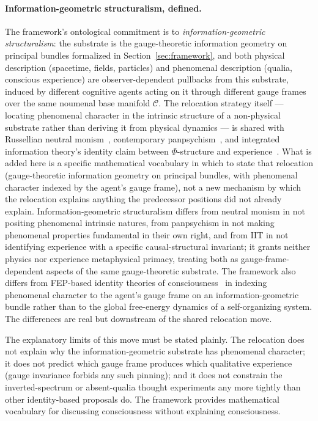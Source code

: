 \documentclass[11pt]{article}
\begin{document}
\paragraph{Information-geometric structuralism, defined.}
The framework's ontological commitment is to \emph{information-geometric structuralism}: the substrate is the gauge-theoretic information geometry on principal bundles formalized in Section~\ref{sec:framework}, and both physical description (spacetime, fields, particles) and phenomenal description (qualia, conscious experience) are observer-dependent pullbacks from this substrate, induced by different cognitive agents acting on it through different gauge frames over the same noumenal base manifold $\mathcal{C}$. The relocation strategy itself — locating phenomenal character in the intrinsic structure of a non-physical substrate rather than deriving it from physical dynamics — is shared with Russellian neutral monism~\cite{Russell1927, Strawson2006}, contemporary panpsychism~\cite{Goff2017, Chalmers2013consciousness}, and integrated information theory's identity claim between $\Phi$-structure and experience~\cite{Tononi2008, Tononi2015}. What is added here is a specific mathematical vocabulary in which to state that relocation (gauge-theoretic information geometry on principal bundles, with phenomenal character indexed by the agent's gauge frame), not a new mechanism by which the relocation explains anything the predecessor positions did not already explain. Information-geometric structuralism differs from neutral monism in not positing phenomenal intrinsic natures, from panpsychism in not making phenomenal properties fundamental in their own right, and from IIT in not identifying experience with a specific causal-structural invariant; it grants neither physics nor experience metaphysical primacy, treating both as gauge-frame-dependent aspects of the same gauge-theoretic substrate. The framework also differs from FEP-based identity theories of consciousness~\cite{Solms2021, Friston2018, Hohwy2022} in indexing phenomenal character to the agent's gauge frame on an information-geometric bundle rather than to the global free-energy dynamics of a self-organizing system. The differences are real but downstream of the shared relocation move.

The explanatory limits of this move must be stated plainly. The relocation does not explain why the information-geometric substrate has phenomenal character; it does not predict which gauge frame produces which qualitative experience (gauge invariance forbids any such pinning); and it does not constrain the inverted-spectrum or absent-qualia thought experiments any more tightly than other identity-based proposals do. The framework provides mathematical vocabulary for discussing consciousness without explaining consciousness.
\end{document}
